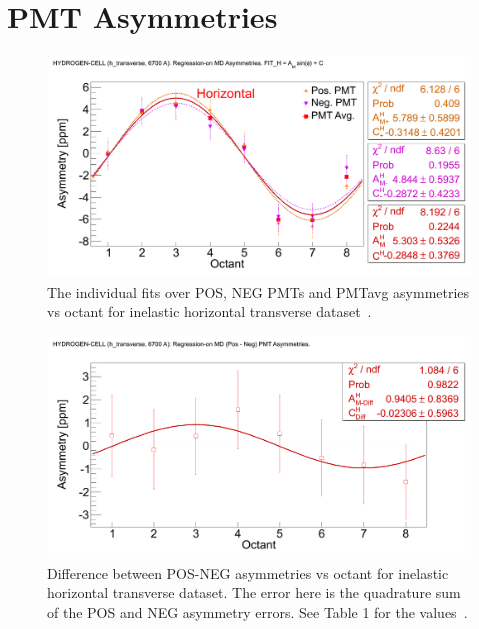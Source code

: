 \section{PMT Asymmetries}
\label{PMT Asymmetries}



\begin{singlespace}
\begin{figure}[!h]
	\begin{center}
	\includegraphics[width=15.0cm]{figures/MD_h_transverse_LH2_PMTAsymmetries_off_on}
	\end{center}
	\caption
	{The individual fits over POS, NEG PMTs and PMTavg asymmetries vs octant for inelastic horizontal transverse dataset~\cite{elog:nur_ancillary145}.}
	\label{fig:MD_h_transverse_LH2_PMTAsymmetries_off_on}
\end{figure}
\end{singlespace}

\begin{singlespace}
\begin{figure}[!h]
	\begin{center}
	\includegraphics[width=15.0cm]{figures/MD_h_transverse_LH2_PMTAsymmetriesDiff_off_on}
	\end{center}
	\caption
	{Difference between POS-NEG asymmetries vs octant for inelastic horizontal transverse dataset. The error here is the quadrature sum of the POS and NEG asymmetry errors. See Table 1 for the values~\cite{elog:nur_ancillary145}.}
	\label{fig:MD_h_transverse_LH2_PMTAsymmetriesDiff_off_on}
\end{figure}
\end{singlespace}

